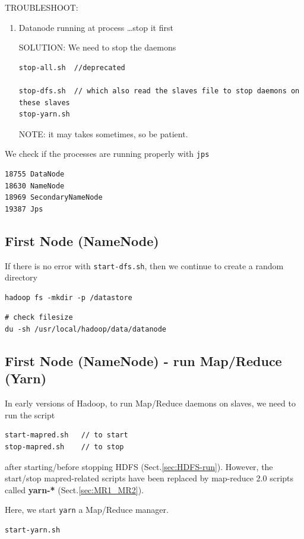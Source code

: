 TROUBLESHOOT:
\begin{enumerate}
  \item Datanode running at process \ldots stop it first
 
 SOLUTION: We need to stop the daemons
\begin{verbatim}
stop-all.sh  //deprecated

stop-dfs.sh  // which also read the slaves file to stop daemons on these slaves
stop-yarn.sh
\end{verbatim}
NOTE: it may takes sometimes, so be patient.

\end{enumerate}

We check if the processes are running properly with \verb!jps!
\begin{verbatim}
18755 DataNode
18630 NameNode
18969 SecondaryNameNode
19387 Jps
\end{verbatim}

\subsection{First Node (NameNode) }

If there is no error with \verb!start-dfs.sh!, then we continue to create a
random directory

\begin{verbatim}
hadoop fs -mkdir -p /datastore
\end{verbatim}

\begin{verbatim}
# check filesize
du -sh /usr/local/hadoop/data/datanode
\end{verbatim}


\subsection{First Node (NameNode) - run Map/Reduce (Yarn)}
\label{sec:map_reduce-run}

In early versions of Hadoop, to run Map/Reduce daemons on slaves, we need to run
the script
\begin{verbatim}
start-mapred.sh   // to start
stop-mapred.sh    // to stop
\end{verbatim}
after starting/before stopping HDFS (Sect.\ref{sec:HDFS-run}). However, the 
start/stop mapred-related scripts have been replaced by map-reduce 2.0 scripts
called {\bf yarn-*} (Sect.\ref{sec:MR1_MR2}).  

Here, we start \verb!yarn! a Map/Reduce manager. 
\begin{verbatim}
start-yarn.sh
\end{verbatim}

